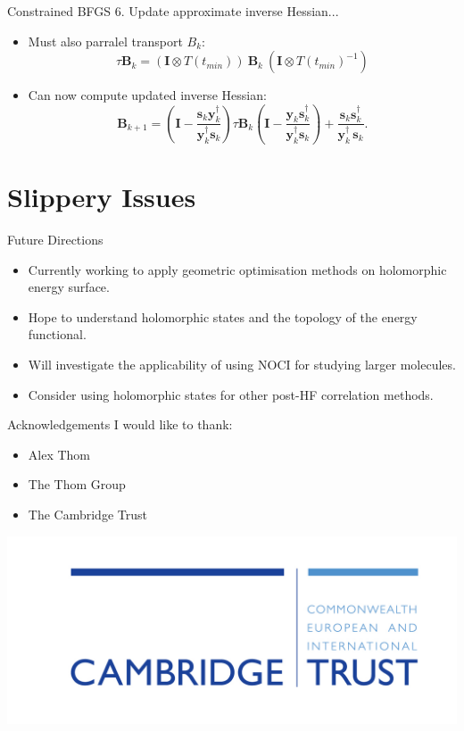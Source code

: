 \documentclass{beamer}
\begin{document}
\begin{frame}{Constrained BFGS}
6. Update approximate inverse Hessian...
\begin{itemize}
\item<1->{Must also parralel transport $B_{k}$:
$$\tau \mathbf{B}_k = (\mathbf{I} \otimes T(t_{min}))\ \mathbf{B}_k \ (\mathbf{I} \otimes T(t_{min})^{-1})$$}
\item<1->{Can now compute updated inverse Hessian:
$$\mathbf{B}_{k+1} =  \left (\mathbf{I}-\frac { \mathbf{s}_k \mathbf{y}_k^{\dagger}} {\mathbf{y}_k^{\dagger} \mathbf{s}_k} \right ) \tau \mathbf{B}_{k} \left (\mathbf{I}-\frac { \mathbf{y}_k \mathbf{s}_k^{\dagger}} {\mathbf{y}_k^{\dagger} \mathbf{s}_k} \right )+\frac
{\mathbf{s}_k \mathbf{s}_k^{\dagger}} {\mathbf{y}_k^{\dagger} \, \mathbf{s}_k}.$$}
 \end{itemize}
 \vspace{2em}

\end{frame}

\section{Slippery Issues}
\begin{frame}{Future Directions}
 \begin{itemize}
  \item<1->{Currently working to apply geometric optimisation methods on holomorphic energy surface.}
  \item<2->{Hope to understand holomorphic states and the topology of the energy functional.}
  \item<3->{Will investigate the applicability of using NOCI for studying larger molecules.}
  \item<4->{Consider using holomorphic states for other post-HF correlation methods.}
 \end{itemize}
\end{frame}

\begin{frame}{Acknowledgements}
 I would like to thank:
 
 \begin{itemize}
  \item{Alex Thom}
  \item{The Thom Group}
  \item{The Cambridge Trust}
 \end{itemize}
 \begin{center}
  \includegraphics[scale=0.7]{template/CT_logo.jpg}
 \end{center}
\end{frame}
\end{document}
